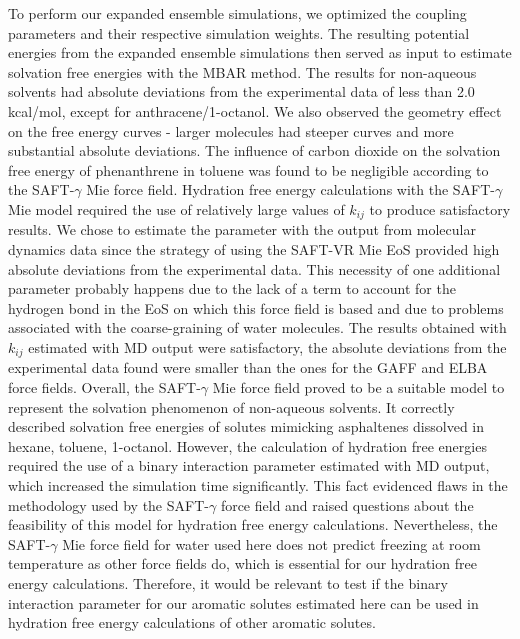 \documentclass[final,12p,times,twocolumn]{elsarticle}
\begin{document}
	To perform our expanded ensemble simulations, we optimized the coupling parameters and their respective simulation weights. The resulting potential energies from the expanded ensemble simulations then served as input to estimate solvation free energies with the MBAR method. The results for non-aqueous solvents had absolute deviations from the experimental data of less than 2.0 kcal/mol, except for anthracene/1-octanol. We also observed the geometry effect on the free energy curves - larger molecules had steeper curves and more substantial absolute deviations. The influence of carbon dioxide on the solvation free energy of phenanthrene in toluene was found to be negligible according to the SAFT-$\gamma$ Mie force field. Hydration free energy calculations with the SAFT-$\gamma$ Mie model required the use of relatively large values of $k_{ij}$ to produce satisfactory results. We chose to estimate the parameter with the output from molecular dynamics data since the strategy of using the SAFT-VR Mie EoS provided high absolute deviations from the experimental data. This necessity of one additional parameter probably happens due to the lack of a term to account for the hydrogen bond in the EoS on which this force field is based and due to problems associated with the coarse-graining of water molecules. The results obtained with $k_{ij}$ estimated with MD output were satisfactory, the absolute deviations from the experimental data found were smaller than the ones for the GAFF and ELBA force fields.
	Overall, the SAFT-$\gamma$ Mie force field proved to be a suitable model to represent the solvation phenomenon of non-aqueous solvents. It correctly described solvation free energies of solutes mimicking asphaltenes dissolved in hexane, toluene, 1-octanol. However, the calculation of hydration free energies required the use of a binary interaction parameter estimated with MD output, which increased the simulation time significantly. This fact evidenced flaws in the methodology used by the SAFT-$\gamma$ force field and raised questions about the feasibility of this model for hydration free energy calculations. Nevertheless, the SAFT-$\gamma$ Mie force field for water used here does not predict freezing at room temperature as other force fields do, which is essential for our hydration free energy calculations.  Therefore, it would be relevant to test if the binary interaction parameter for our aromatic solutes estimated here can be used in hydration free energy calculations of other aromatic solutes.
	
	
	
\end{document}
